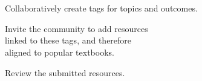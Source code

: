 \documentclass{chalkboard}
\begin{document}
\begin{frame}
\end{frame}
\begin{frame}[nofills]
\vfill


\vfill
\end{frame}
\clearbackgroundpicture

\begin{frame}
\end{frame}
\begin{frame}[nofills]
\vfill

 \\[16pt]
 \\[16pt]

\vfill
\end{frame}
\clearbackgroundpicture

\begin{frame}[nofills]
\huge
\vfill
\vfill

Collaboratively create tags for topics and outcomes.

\vfill

Invite the community to add resources \\
\quad linked to these tags, and therefore \\
\quad aligned to popular textbooks.

\vfill

Review the submitted resources.

\vfill
\vfill
\end{frame}

\begin{frame}
\end{frame}

\begin{frame}
\end{frame}

\begin{frame}
\end{frame}

\begin{frame}
\end{frame}
\end{document}
